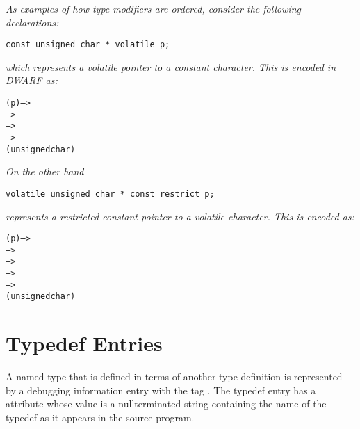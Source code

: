 \textit{As examples of how type modifiers are ordered, consider the following
 declarations:}
\begin{lstlisting}[numbers=none]
   const unsigned char * volatile p;
\end{lstlisting}
\textit{which represents a volatile pointer to a constant
character. This is encoded in DWARF as:}

\begin{dwflisting}
\begin{alltt}
        (p) -->
             -->
                 -->
                     -->
                        (unsigned char)
\end{alltt}
\end{dwflisting}

\textit{On the other hand}
\begin{lstlisting}[numbers=none]                        
   volatile unsigned char * const restrict p;
\end{lstlisting}
\textit{represents a restricted constant
pointer to a volatile character. This is encoded as:}

\begin{dwflisting}
\begin{alltt}
        (p) -->
             -->
                 -->
                     -->
                         -->
                            (unsigned char)
\end{alltt}
\end{dwflisting}

\section{Typedef Entries}
\label{chap:typedefentries}
A named type that is defined in terms of another type
definition is represented by a debugging information entry with
the tag . 
The typedef entry has a  attribute 
whose value is a null\dash terminated string containing
the name of the typedef as it appears in the source program.

